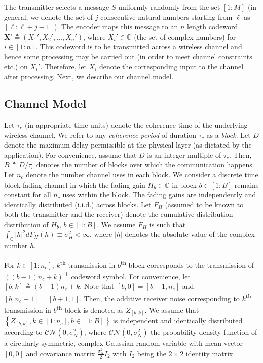 \documentclass[conference]{IEEEtran}
\begin{document}
The transmitter selects a message $S$ uniformly randomly from the set $[1:M]$ (in general, we denote the set of $j$ consecutive natural numbers starting from $\ell$  as $[\ell:\ell+j-1]$). The encoder maps this message to an $n$ length codeword $\mathbf{X}'\triangleq \left(X_{1}',X_{2}',\dots, X_{n}'\right)$, where $X_{i}'\in\mathbb{C}$ (the set of complex numbers) for $i\in[1:n]$. This codeword is to be transmitted across a wireless channel and hence some processing may be carried out (in order to meet channel constraints etc.) on $X_i'$. Therefore, let $X_i$ denote the corresponding input to the channel after processing. Next, we describe our channel model. 

\subsection{Channel Model}
Let $\tau_c$ (in appropriate time units) denote the coherence time of the underlying wireless channel. We refer to any \emph{coherence period} of duration $\tau_c$ as a \emph{block}. Let $D$ denote the maximum delay permissible at the physical layer (as dictated by the application). For convenience, assume that $D$ is an integer multiple of $\tau_c$. Then, $B\triangleq D/\tau_c$ denotes the number of blocks over which the communication happens.   Let $n_c$ denote the number channel uses in each block. We consider a discrete time block fading channel in which the fading gain $H_b\in\mathbb{C}$ in block $b\in[1:B]$ remains constant for all $n_c$ uses within the block. The fading gains are independently and identically distributed (i.i.d.) across blocks.  Let $F_{H}$ (assumed to be known to both the transmitter and the receiver) denote the cumulative distribution distribution of $H_b$, $b\in[1:B]$. We assume $F_{H}$ is such that $\int_{\mathbb{C}}|h|^2dF_H(h)\equiv \sigma_H^2<\infty$, where $|h|$ denotes the absolute value of the complex number $h$. 
\par For $k\in[1:n_c]$, $k$\textsuperscript{th} transmission in $b$\textsuperscript{th} block corresponds to the transmission of $\left((b-1)n_c+k\right)$\textsuperscript{th} codeword symbol. For convenience, let $[b, k]\triangleq (b-1)n_c+k$. Note that $[b, 0] = [b-1, n_c]$ and $[b, n_c+1] = [b+1, 1]$. Then, the additive receiver noise corresponding   to $k$\textsuperscript{th} transmission in $b$\textsuperscript{th} block is denoted as $Z_{[b,k]}$. We assume that $\left\{Z_{[b,k]},k\in[1:n_c],b\in[1:B]\right\}$ is independent and identically distributed according to $\mathcal{C}\mathcal{N}\left(0,\sigma_N^2\right)$, where $\mathcal{C}\mathcal{N}\left(0,\sigma_N^2\right)$ the probability density function of a circularly symmetric, complex Gaussian random variable  with mean vector $[0,0]$ and covariance matrix $\frac{\sigma_N^2}{2}I_2$ with $I_2$ being the $2\times 2$ identity matrix.
\end{document}
